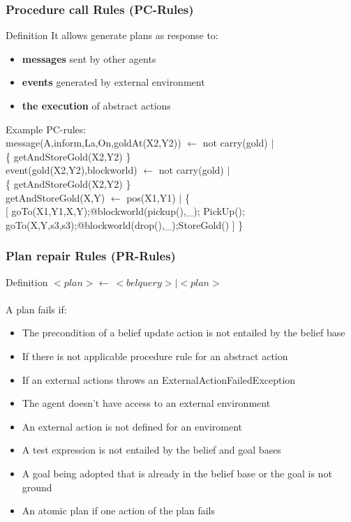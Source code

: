 \documentclass{beamer}
\newcommand\tab[1][1cm]{\hspace*{#1}}
\begin{document}
\begin{frame}
\frametitle{Procedure call Rules (PC-Rules)}
	\begin{block}{Definition}
    	It allows generate plans as response to:
        \begin{itemize}
            \item \textbf{messages} sent by other agents 
            \item \textbf{events} generated by external environment 
            \item \textbf{the execution} of abstract actions
        \end{itemize}
    \end{block}
    
    \begin{block}{Example}
    	PC-rules:\\
  		\tab message(A,inform,La,On,goldAt(X2,Y2)) $\leftarrow$  not carry(gold) $|$\\
        \tab \tab \tab \{ getAndStoreGold(X2,Y2) \}\\
        \tab event(gold(X2,Y2),blockworld) $\leftarrow$  not carry(gold) $|$\\
    	\tab \tab \tab \{ getAndStoreGold(X2,Y2) \}\\ 
        \tab getAndStoreGold(X,Y) $\leftarrow$ pos(X1,Y1) $|$ \{ \\
    	\tab \tab  $[$ goTo(X1,Y1,X,Y);@blockworld(pickup(),\_); PickUp(); \\
        \tab \tab  goTo(X,Y,s3,s3);@blockworld(drop(),\_);StoreGold() $]$ \} 
    \end{block}
\end{frame}
\begin{frame}
\frametitle{Plan repair Rules (PR-Rules)}
  \begin{block}{Definition}
	$<plan>\leftarrow\ <belquery> | <plan> $ \\~\\
    A plan fails if:
   	\begin{itemize}
   	 	\item The precondition of a belief update action is not entailed by the belief base
   	 	\item If there is not applicable procedure rule for an abstract action
        \item If an external actions throws an ExternalActionFailedException
        \item The agent doesn't have access to an external environment 
        \item An external action is not defined for an enviroment
        \item A test expression is not entailed by the belief and goal bases
        \item A goal being adopted that is already in the belief base or the goal is not ground
        \item An atomic plan if one action of the plan fails
   	\end{itemize} 
  \end{block}
\end{frame}
\end{document}
